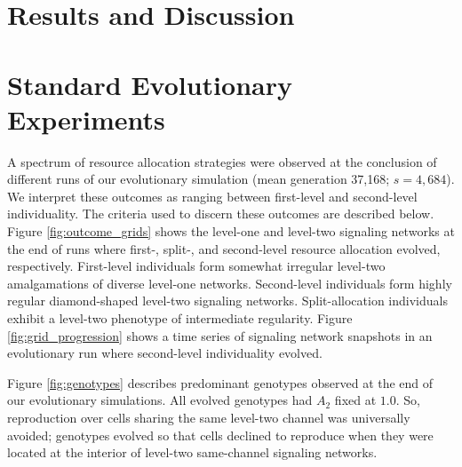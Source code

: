 \section{Results and Discussion}

\section{Standard Evolutionary Experiments}







A spectrum of resource allocation strategies were observed at the conclusion of different runs of our evolutionary simulation (mean generation 37,168; $s=4,684$).
We interpret these outcomes as ranging between first-level and second-level individuality.
The criteria used to discern these outcomes are described below.
Figure \ref{fig:outcome_grids} shows the level-one and level-two signaling networks at the end of runs where first-, split-, and second-level resource allocation evolved, respectively.
First-level individuals form somewhat irregular level-two amalgamations of diverse level-one networks.
Second-level individuals form highly regular diamond-shaped level-two signaling networks.
Split-allocation individuals exhibit a level-two phenotype of intermediate regularity.
Figure \ref{fig:grid_progression} shows a time series of signaling network snapshots in an evolutionary run where second-level individuality evolved.

Figure \ref{fig:genotypes} describes predominant genotypes observed at the end of our evolutionary simulations.
All evolved genotypes had $A_2$ fixed at $1.0$.
So, reproduction over cells sharing the same level-two channel was universally avoided;
genotypes evolved so that cells declined to reproduce when they were located at the interior of level-two same-channel signaling networks.

